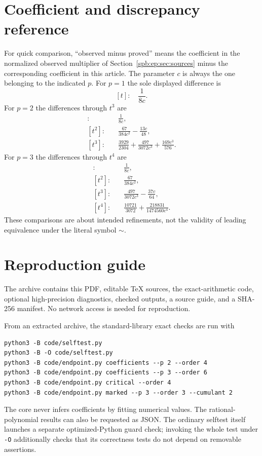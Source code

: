 \appendix
\section{Coefficient and discrepancy reference}
\label{spb:ep:app:discrepancies}
For quick comparison, ``observed minus proved'' means the coefficient in the
normalized observed multiplier of Section~\ref{spb:ep:sec:sources} minus the
corresponding coefficient in this article. The parameter $c$ is always the
one belonging to the indicated $p$.
For $p=1$ the sole displayed difference is
\[
 [t]:\quad \frac1{8c}.
\]
For $p=2$ the differences through $t^3$ are
\begin{align*}
 [t]:&\quad \frac1{8c},\\
 [t^2]:&\quad \frac{67}{384c^2}-\frac{13c}{48},\\
 [t^3]:&\quad \frac{3929}{2304}+\frac{497}{3072c^3}
                                      +\frac{169c^3}{576}.
\end{align*}
For $p=3$ the differences through $t^4$ are
\begin{align*}
 [t]:&\quad \frac1{8c},\\
 [t^2]:&\quad \frac{67}{384c^2},\\
 [t^3]:&\quad \frac{497}{3072c^3}-\frac{37c}{64},\\
 [t^4]:&\quad \frac{10721}{3072}+\frac{218831}{1474560c^4}.
\end{align*}
These comparisons are about intended refinements, not the validity of
leading equivalence under the literal symbol $\sim$.

\section{Reproduction guide}
\label{spb:ep:app:reproduce}
The archive contains this PDF, editable TeX sources, the exact-arithmetic
code, optional high-precision diagnostics, checked outputs, a source guide,
and a SHA-256 manifest. No network access is needed for reproduction.

From an extracted archive, the standard-library exact checks are run with
\begin{verbatim}
python3 -B code/selftest.py
python3 -B -O code/selftest.py
python3 -B code/endpoint.py coefficients --p 2 --order 4
python3 -B code/endpoint.py coefficients --p 3 --order 6
python3 -B code/endpoint.py critical --order 4
python3 -B code/endpoint.py marked --p 3 --order 3 --cumulant 2
\end{verbatim}
The core never infers coefficients by fitting numerical values.
The rational-polynomial results can also be requested as JSON.
The ordinary selftest itself launches a separate optimized-Python guard
check; invoking the whole test under \texttt{-O} additionally checks that
its correctness tests do not depend on removable assertions.

